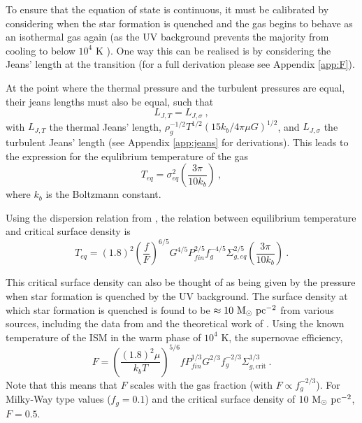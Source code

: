     To ensure that the equation of state is continuous, it must be calibrated by considering when the star formation is quenched and the gas begins to behave as an isothermal gas again (as the UV background prevents the majority from cooling to below $10^4$ K \citep{gnat_time-dependent_2007}).
One way this can be realised is by considering the Jeans' length at the transition (for a full derivation please see Appendix \ref{app:F}).

At the point where the thermal pressure and the turbulent pressures are equal, their jeans lengths must also be equal, such that
$$
     L_{J, T} = L_{J, \sigma}~,
$$
with $L_{J, T}$ the thermal Jeans' length, $ \rho_g^{-1/2} T^{1/2} \left({15k_b}/{4\pi \mu G}\right)^{1/2} $, and $L_{J, \sigma}$ the turbulent Jeans' length (see Appendix \ref{app:jeans} for derivations).
This leads to the expression for the equlibrium temperature of the gas
\begin{equation}
    T_{eq} = \sigma^2_{eq} \left(\frac{3 \pi}{10 k_b}\right)~,
    \label{eqn:teq}
\end{equation}
where $k_b$ is the Boltzmann constant.

Using the dispersion relation from \citet{martizzi_supernova_2015}, the relation between equilibrium temperature and critical surface density is
$$
T_{eq} = (1.8)^2 \left(\frac{f}{F}\right)^{6/5} G^{4/5} P_{fin}^{2/5} f_g^{-4/5} \Sigma_{g, eq}^{2/5} \left(\frac{3\pi}{10k_b}\right)~.
$$

This critical surface density can also be thought of as being given by the pressure when star formation is quenched by the UV background.
The surface density at which star formation is quenched is found to be $\approx 10 ~\mathrm{M}_{\odot} ~\mathrm{pc}^{-2}$ from various sources, including the data from \citet{bigiel_star_2008} and the theoretical work of \citet{schaye_star_2004}.
Using the known temperature of the ISM in the warm phase of $10^{4}$ K, the supernovae efficiency,
\begin{equation}
    F = \left(\frac{(1.8)^2 \mu}{k_b T}\right)^{5/6} f P_{fin}^{1/3} G^{2/3} f_g^{-2/3} \Sigma_{g, \mathrm{crit}}^{1/3}~.
    \label{eqn:Fcalib}
\end{equation}
Note that this means that $F$ scales with the gas fraction (with $F \propto f_g^{-2/3}$).
For Milky-Way type values ($f_g = 0.1$) and the critical surface density of $10 ~\mathrm{M}_{\odot} ~\mathrm{pc}^{-2}$, $F=0.5$.
